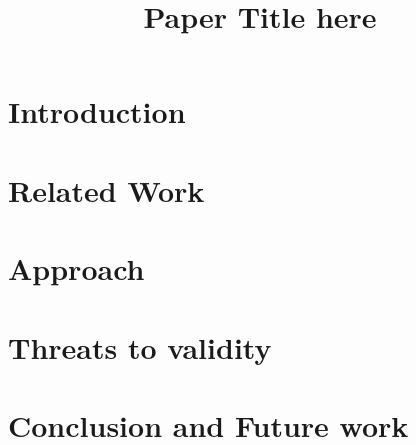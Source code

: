 \documentclass[conference]{IEEEtran}
\begin{document}
\title{Paper Title here}

\author{

}

\maketitle

\begin{abstract}
\end{abstract}

\IEEEpeerreviewmaketitle

\section{Introduction}
\label{sec:introduction}


\section{Related Work}
\label{sec:related_work}


\section{Approach}
\label{sec:approach}


\section{Threats to validity}
\label{sec:threats_to_validity}


\section{Conclusion and Future work}
\label{sec:conclusion}




\end{document}
